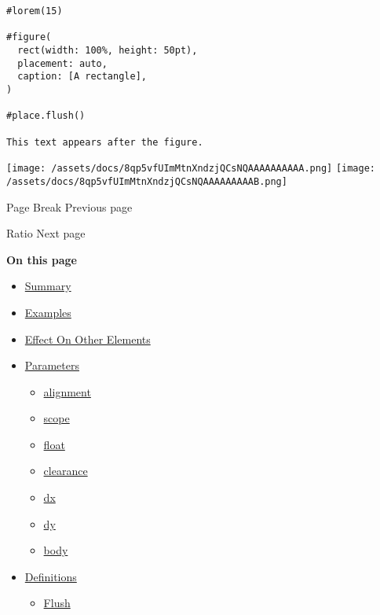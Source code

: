 \begin{verbatim}
#lorem(15)

#figure(
  rect(width: 100%, height: 50pt),
  placement: auto,
  caption: [A rectangle],
)

#place.flush()

This text appears after the figure.
\end{verbatim}

\texttt{[image: /assets/docs/8qp5vfUImMtnXndzjQCsNQAAAAAAAAAA.png]}
\texttt{[image: /assets/docs/8qp5vfUImMtnXndzjQCsNQAAAAAAAAAB.png]}

\href{/docs/reference/layout/pagebreak/}{\pandocbounded{}}

{ Page Break } { Previous page }

\href{/docs/reference/layout/ratio/}{\pandocbounded{}}

{ Ratio } { Next page }

\textbf{On this page}

\begin{itemize}
\tightlist
\item
  \hyperref[summary]{Summary}
\item
  \hyperref[examples]{Examples}
\item
  \hyperref[effect-on-other-elements]{Effect On Other Elements}
\item
  \hyperref[parameters]{Parameters}

  \begin{itemize}
  \tightlist
  \item
    \hyperref[parameters-alignment]{alignment}
  \item
    \hyperref[parameters-scope]{scope}
  \item
    \hyperref[parameters-float]{float}
  \item
    \hyperref[parameters-clearance]{clearance}
  \item
    \hyperref[parameters-dx]{dx}
  \item
    \hyperref[parameters-dy]{dy}
  \item
    \hyperref[parameters-body]{body}
  \end{itemize}
\item
  \hyperref[definitions]{Definitions}

  \begin{itemize}
  \tightlist
  \item
    \hyperref[definitions-flush]{Flush}
  \end{itemize}
\end{itemize}

